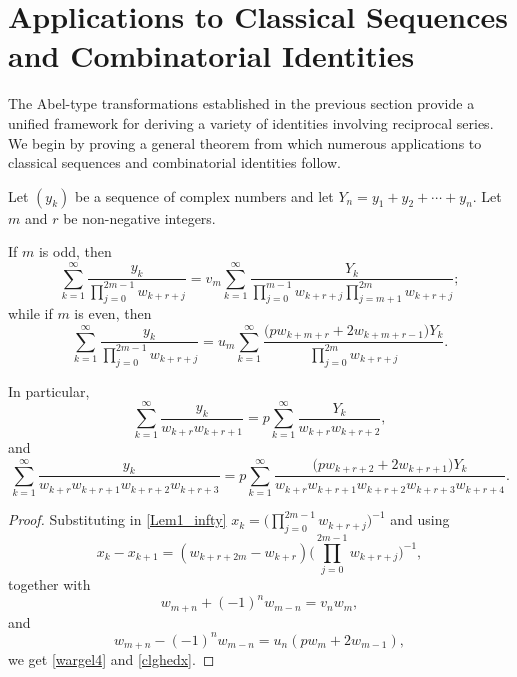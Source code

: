\documentclass[12pt,reqno]{article}
\begin{document}
\section{Applications to Classical Sequences and Combinatorial Identities}\label{Sect4}


The Abel-type transformations established in the previous section provide a unified framework for deriving a variety of identities involving reciprocal series. We begin by proving a general theorem from which numerous applications to classical sequences and combinatorial identities follow.
\begin{theorem}\label{yjr6p1s}
	Let $(y_k)$ be a sequence of complex numbers and let $Y_n=y_1+y_2+\cdots+ y_n$. Let $m$ and $r$ be non-negative integers. 
	
	If $m$ is odd, then
		\begin{equation}\label{wargel4}
		\sum_{k = 1}^\infty  \frac{y_k}{\prod\limits_{j = 0}^{2m - 1} {w_{k + r + j} } }  = v_m\sum_{k = 1}^\infty  \frac{Y_k
		}{\prod\limits_{j = 0}^{m - 1} {w_{k + r + j} } \prod\limits_{j = m + 1}^{2m} {w_{k + r + j}}};
		\end{equation}
	while if $m$ is even, then
		\begin{equation}\label{clghedx}
		\sum_{k = 1}^\infty  {\frac{{y_k }}{{\prod\limits_{j = 0}^{2m - 1} {w_{k + r + j} } }}}  = u_m\sum_{k = 1}^\infty  \frac{\big( pw_{k + m + r }  + 2w_{k + m + r - 1}  \big)Y_k
		}{{\prod\limits_{j = 0}^{2m} {w_{k + r + j} } }}  .
		\end{equation}
	
	In particular,
		\begin{equation*}
		\sum_{k = 1}^\infty  {\frac{{y_k }}{{w_{k + r} w_{k + r + 1} }}}  = p \sum_{k = 1}^\infty \frac{Y_k}{{w_{k + r} w_{k + r + 2} }} , 
		\end{equation*}
	and
		\begin{equation*}
		\sum_{k = 1}^\infty  {\frac{{y_k }}{{w_{k + r} w_{k + r + 1} w_{k + r + 2} w_{k + r + 3} }}}  = p \sum_{k = 1}^\infty  \frac{{\big( {pw_{k + r + 2}  + 2w_{k + r + 1} } \big)Y_k}}{w_{k + r} w_{k + r + 1} w_{k + r + 2}w_{k + r + 3}w_{k + r + 4}}.
		\end{equation*}
\end{theorem}
\begin{proof} 
	Substituting in \eqref{Lem1_infty}
	$x_k = \big(\prod_{j = 0}^{2m - 1} {w_{k + r + j} }\big)^{-1}$
	and using 
		\begin{equation*}
		x_k  - x_{k + 1}  = (w_{k + r + 2m}  - w_{k + r})\Big(\prod\limits_{j = 0}^{2m - 1} {w_{k + r + j} } \Big)^{-1},
		\end{equation*}
	together with 
	$$w_{m + n} + (- 1)^n w_{m - n} = v_n w_m,$$ and $$w_{m + n} - (- 1)^n w_{m - n} = u_n ( pw_{m} + 2w_{m - 1}),$$
	we get \eqref{wargel4} and \eqref{clghedx}. 
\end{proof}
\end{document}
